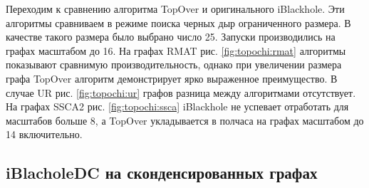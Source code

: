 \documentclass[12pt,a4paper,oneside,openany]{article}
\theoremstyle{definition}
\theoremstyle{lemma}
\theoremstyle{remark}
\begin{document}
Переходим к сравнению алгоритма TopOver и оригинального iBlackhole.
Эти алгоритмы сравниваем в режиме поиска черных дыр ограниченного размера.
В качестве такого размера было выбрано число 25.
Запуски производились на графах масштабом до 16.
На графах RMAT рис. \ref{fig:topochi:rmat} алгоритмы показывают сравнимую производительность,
однако при увеличении размера графа TopOver алгоритм демонстрирует ярко выраженное преимущество.
В случае UR рис. \ref{fig:topochi:ur} графов разница между алгоритмами отсутствует.
На графах SSCA2 рис. \ref{fig:topochi:ssca} iBlackhole не успевает отработать для масштабов больше 8, а TopOver укладывается
в полчаса на графах масштабом до 14 включительно.

\subsection{iBlacholeDC на сконденсированных графах}\label{subsec:topsortasync}
\end{document}
